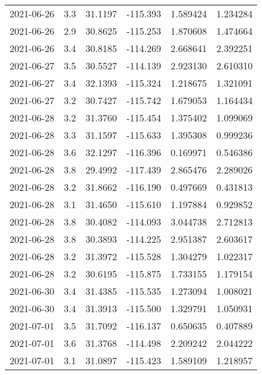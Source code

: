 \begin{tabular}{lrrrrr}
2021-06-26 &       3.3 &  31.1197 &  -115.393 &         1.589424 &         1.234284 \\
2021-06-26 &       2.9 &  30.8625 &  -115.253 &         1.870608 &         1.474664 \\
2021-06-26 &       3.4 &  30.8185 &  -114.269 &         2.668641 &         2.392251 \\
2021-06-27 &       3.5 &  30.5527 &  -114.139 &         2.923130 &         2.610310 \\
2021-06-27 &       3.4 &  32.1393 &  -115.324 &         1.218675 &         1.321091 \\
2021-06-27 &       3.2 &  30.7427 &  -115.742 &         1.679053 &         1.164434 \\
2021-06-28 &       3.2 &  31.3760 &  -115.454 &         1.375402 &         1.099069 \\
2021-06-28 &       3.3 &  31.1597 &  -115.633 &         1.395308 &         0.999236 \\
2021-06-28 &       3.6 &  32.1297 &  -116.396 &         0.169971 &         0.546386 \\
2021-06-28 &       3.8 &  29.4992 &  -117.439 &         2.865476 &         2.289026 \\
2021-06-28 &       3.2 &  31.8662 &  -116.190 &         0.497669 &         0.431813 \\
2021-06-28 &       3.1 &  31.4650 &  -115.610 &         1.197884 &         0.929852 \\
2021-06-28 &       3.8 &  30.4082 &  -114.093 &         3.044738 &         2.712813 \\
2021-06-28 &       3.8 &  30.3893 &  -114.225 &         2.951387 &         2.603617 \\
2021-06-28 &       3.2 &  31.3972 &  -115.528 &         1.304279 &         1.022317 \\
2021-06-28 &       3.2 &  30.6195 &  -115.875 &         1.733155 &         1.179154 \\
2021-06-30 &       3.4 &  31.4385 &  -115.535 &         1.273094 &         1.008021 \\
2021-06-30 &       3.4 &  31.3913 &  -115.500 &         1.329791 &         1.050931 \\
2021-07-01 &       3.5 &  31.7092 &  -116.137 &         0.650635 &         0.407889 \\
2021-07-01 &       3.6 &  31.3768 &  -114.498 &         2.209242 &         2.044222 \\
2021-07-01 &       3.1 &  31.0897 &  -115.423 &         1.589109 &         1.218957 \\

\end{tabular}
